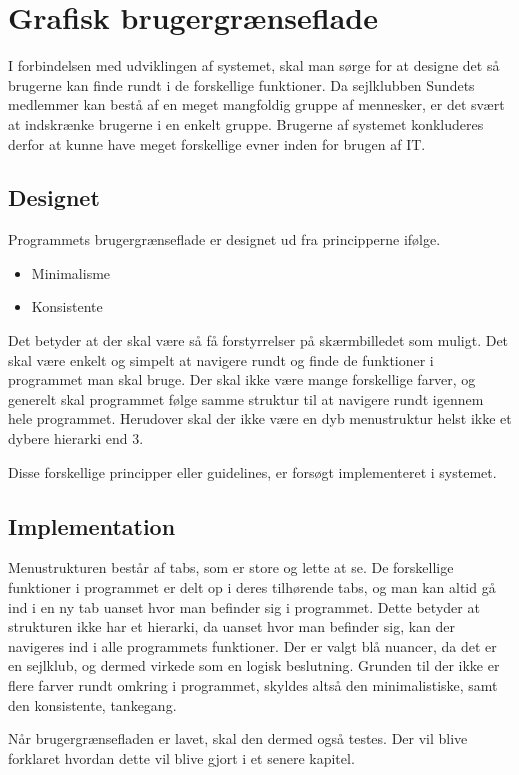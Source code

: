 \chapter{Grafisk brugergrænseflade} \label{chap:GUI}

I forbindelsen med udviklingen af systemet, skal man sørge for at designe det så brugerne kan finde rundt i de forskellige funktioner. Da sejlklubben Sundets medlemmer kan bestå af en meget mangfoldig gruppe af mennesker, er det svært at indskrænke brugerne i en enkelt gruppe. Brugerne af systemet konkluderes derfor at kunne have meget forskellige evner inden for brugen af IT.

\section{Designet} \label{sec:Designet}

Programmets brugergrænseflade er designet ud fra principperne ifølge. \citep{gui1} 

\begin{itemize}
	\item Minimalisme
	\item Konsistente
\end{itemize}

Det betyder at der skal være så få forstyrrelser på skærmbilledet som muligt. Det skal være enkelt og simpelt at navigere rundt og finde de funktioner i programmet man skal bruge. Der skal ikke være mange forskellige farver, og generelt skal programmet følge samme struktur til at navigere rundt igennem hele programmet. Herudover skal der ikke være en dyb menustruktur helst ikke et dybere hierarki end 3.

Disse forskellige principper eller guidelines, er forsøgt implementeret i systemet.

\section{Implementation}\label{sec:Implementation}

Menustrukturen består af tabs, som er store og lette at se. De forskellige funktioner i programmet er delt op i deres tilhørende tabs, og man kan altid gå ind i en ny tab uanset hvor man befinder sig i programmet. Dette betyder at strukturen ikke har et hierarki, da uanset hvor man befinder sig, kan der navigeres ind i alle programmets funktioner. Der er valgt blå nuancer, da det er en sejlklub, og dermed virkede som en logisk beslutning. Grunden til der ikke er flere farver rundt omkring i programmet, skyldes altså den minimalistiske, samt den konsistente, tankegang.


Når brugergrænsefladen er lavet, skal den dermed også testes. Der vil blive forklaret hvordan dette vil blive gjort i et senere kapitel. 